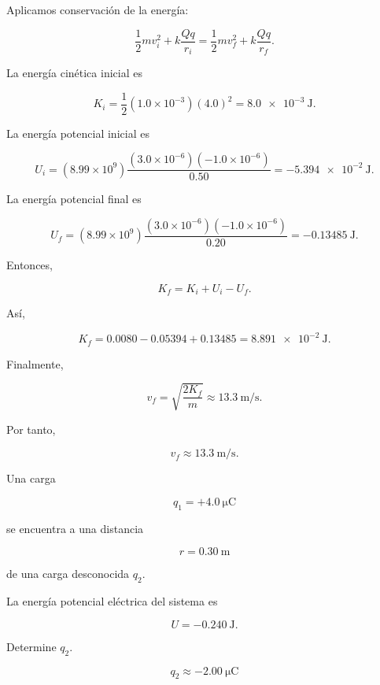 \begin{explicacion}

Aplicamos conservación de la energía:

\[
\frac12mv_i^2
+
k\frac{Qq}{r_i}
=
\frac12mv_f^2
+
k\frac{Qq}{r_f}.
\]

La energía cinética inicial es

\[
K_i
=
\frac12(1.0\times10^{-3})(4.0)^2
=
\SI{8.0e-3}{\joule}.
\]

La energía potencial inicial es

\[
U_i
=
(8.99\times10^9)
\frac{(3.0\times10^{-6})(-1.0\times10^{-6})}{0.50}
=
-\SI{5.394e-2}{\joule}.
\]

La energía potencial final es

\[
U_f
=
(8.99\times10^9)
\frac{(3.0\times10^{-6})(-1.0\times10^{-6})}{0.20}
=
-\SI{0.13485}{\joule}.
\]

Entonces,

\[
K_f=K_i+U_i-U_f.
\]

Así,

\[
K_f
=
0.0080-0.05394+0.13485
=
\SI{8.891e-2}{\joule}.
\]

Finalmente,

\[
v_f
=
\sqrt{\frac{2K_f}{m}}
\approx\SI{13.3}{\metre\per\second}.
\]

Por tanto,

\[
\boxed{v_f\approx\SI{13.3}{\metre\per\second}}.
\]

\end{explicacion}


\begin{ejercicio}

Una carga

\[
q_1=+\SI{4.0}{\micro\coulomb}
\]

se encuentra a una distancia

\[
r=\SI{0.30}{\metre}
\]

de una carga desconocida \(q_2\).

La energía potencial eléctrica del sistema es

\[
U=-\SI{0.240}{\joule}.
\]

Determine \(q_2\).

\end{ejercicio}

\begin{respuesta}

\[
\boxed{q_2\approx-\SI{2.00}{\micro\coulomb}}
\]

\end{respuesta}

